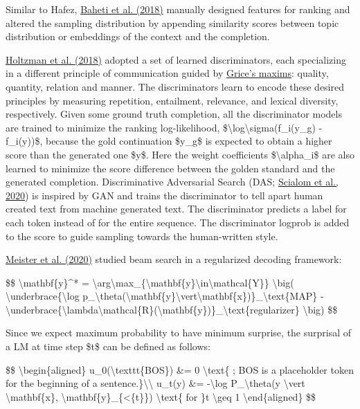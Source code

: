 Similar to Hafez, \href{https://arxiv.org/abs/1809.01215}{Baheti et al. (2018)} manually designed features for ranking and altered the sampling distribution by appending similarity scores between topic distribution or embeddings of the context and the completion.

\href{https://arxiv.org/abs/1805.06087}{Holtzman et al. (2018)} adopted a set of learned discriminators, each specializing in a different principle of communication guided by \href{https://en.wikipedia.org/wiki/Cooperative_principle}{Grice's maxims}: quality, quantity, relation and manner. The discriminators learn to encode these desired principles by measuring repetition, entailment, relevance, and lexical diversity, respectively. Given some ground truth completion, all the discriminator models are trained to minimize the ranking log-likelihood, \$\textbackslash log\textbackslash sigma(f\_i(y\_g) - f\_i(y))\$, because the gold continuation \$y\_g\$ is expected to obtain a higher score than the generated one \$y\$. Here the weight coefficients \$\textbackslash alpha\_i\$ are also learned to minimize the score difference between the golden standard and the generated completion. Discriminative Adversarial Search (DAS; \href{https://arxiv.org/abs/2002.10375}{Scialom et al., 2020}) is inspired by GAN and trains the discriminator to tell apart human created text from machine generated text. The discriminator predicts a label for each token instead of for the entire sequence. The discriminator logprob is added to the score to guide sampling towards the human-written style.

\href{https://arxiv.org/abs/2010.02650}{Meister et al. (2020)} studied beam search in a regularized decoding framework:

\$\$ \textbackslash mathbf\{y\}\^{}* = \textbackslash arg\textbackslash max\_\{\textbackslash mathbf\{y\}\textbackslash in\textbackslash mathcal\{Y\}\} \textbackslash big( \textbackslash underbrace\{\textbackslash log p\_\textbackslash theta(\textbackslash mathbf\{y\}\textbackslash vert\textbackslash mathbf\{x\})\}\_\textbackslash text\{MAP\} - \textbackslash underbrace\{\textbackslash lambda\textbackslash mathcal\{R\}(\textbackslash mathbf\{y\})\}\_\textbackslash text\{regularizer\} \textbackslash big) \$\$

Since we expect maximum probability to have minimum surprise, the surprisal of a LM at time step \$t\$ can be defined as follows:

\$\$ \textbackslash begin\{aligned\} u\_0(\textbackslash texttt\{BOS\}) \&= 0 \textbackslash text\{ ; BOS is a placeholder token for the beginning of a sentence.\}\textbackslash\textbackslash{} u\_t(y) \&= -\textbackslash log P\_\textbackslash theta(y \textbackslash vert \textbackslash mathbf\{x\}, \textbackslash mathbf\{y\}\_\{\textless\{t\}\}) \textbackslash text\{ for \}t \textbackslash geq 1 \textbackslash end\{aligned\} \$\$

